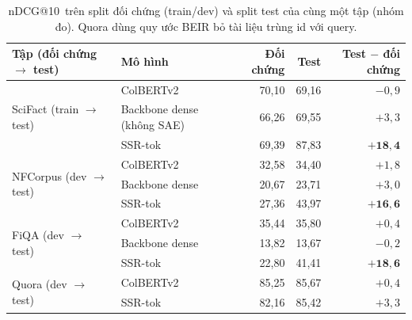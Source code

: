\documentclass[a4paper,13pt]{extreport}
\makeatletter
\theoremstyle{plain}
\newcommand{\ssr}{SSR}
\newcommand{\ndcg}{nDCG@10}
\makeatother
\begin{document}
\begin{table}[htbp]
\centering
\caption[\ndcg\ trên split đối chứng và split test (nhóm đo)]{\ndcg\ trên split đối chứng (train/dev) và split test của cùng một tập (nhóm đo). Quora dùng quy ước BEIR bỏ tài liệu trùng id với query.}
\label{tab:split}
\small
\begin{tabular}{llrrr}
\toprule
\textbf{Tập (đối chứng $\to$ test)} & \textbf{Mô hình} & \textbf{Đối chứng} & \textbf{Test} & \textbf{Test $-$ đối chứng}\\
\midrule
\multirow{3}{*}{SciFact (train $\to$ test)} & ColBERTv2 & 70,10 & 69,16 & $-0{,}9$\\
 & Backbone dense (không SAE) & 66,26 & 69,55 & $+3{,}3$\\
 & \ssr-tok & 69,39 & 87,83 & $\mathbf{+18{,}4}$\\
\midrule
\multirow{3}{*}{NFCorpus (dev $\to$ test)} & ColBERTv2 & 32,58 & 34,40 & $+1{,}8$\\
 & Backbone dense & 20,67 & 23,71 & $+3{,}0$\\
 & \ssr-tok & 27,36 & 43,97 & $\mathbf{+16{,}6}$\\
\midrule
\multirow{3}{*}{FiQA (dev $\to$ test)} & ColBERTv2 & 35,44 & 35,80 & $+0{,}4$\\
 & Backbone dense & 13,82 & 13,67 & $-0{,}2$\\
 & \ssr-tok & 22,80 & 41,41 & $\mathbf{+18{,}6}$\\
\midrule
\multirow{2}{*}{Quora (dev $\to$ test)} & ColBERTv2 & 85,25 & 85,67 & $+0{,}4$\\
 & \ssr-tok & 82,16 & 85,42 & $+3{,}3$\\
\bottomrule
\end{tabular}
\end{table}
\end{document}
